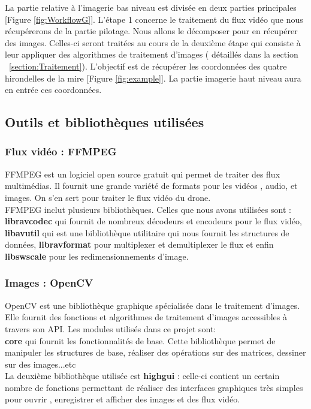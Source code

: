 \documentclass[12pt]{article}
\begin{document}
La partie relative à l'imagerie bas niveau est divisée en deux parties principales [Figure \ref{fig:WorkflowG}]. L'étape 1 concerne le traitement du flux vidéo que nous récupérerons de la partie pilotage. Nous allons le décomposer pour en récupérer des images. Celles-ci seront traitées au cours de la deuxième étape qui consiste à leur appliquer des algorithmes de traitement d'images ( détaillés dans la section ~\ref{section:Traitement}). L'objectif est de récupérer les coordonnées des quatre hirondelles de la mire [Figure \ref{fig:example}].
La partie imagerie haut niveau aura en entrée ces coordonnées.


\subsection{Outils et bibliothèques utilisées}
\subsubsection{Flux vidéo : FFMPEG}
FFMPEG \cite{FFMPEG} est un logiciel open source gratuit qui permet de traiter des flux multimédias. Il fournit une grande variété de formats pour les vidéos , audio, et images. On s'en sert pour traiter le flux vidéo du drone.\\ FFMPEG inclut plusieurs bibliothèques. Celles que nous avons utilisées sont : \textbf{libravcodec} qui fournit de nombreux décodeurs et encodeurs pour le flux vidéo, \textbf{libavutil} qui est une bibliothèque utilitaire qui nous fournit les structures de données, \textbf{libravformat} pour multiplexer et demultiplexer le flux et enfin \textbf{libswscale} pour les redimensionnements d'image.

\subsubsection{Images : OpenCV}
OpenCV \cite{OpenCV} est une bibliothèque graphique spécialisée dans le traitement d’images. Elle fournit des fonctions et algorithmes de traitement d'images accessibles à travers son API. Les modules utilisés dans ce projet sont:\\
\textbf{core} qui fournit les fonctionnalités de base. Cette bibliothèque permet de manipuler les structures de base, réaliser des opérations sur des matrices, dessiner sur des images...etc\\La deuxième bibliothèque utilisée est \textbf{highgui} : celle-ci contient un certain nombre de fonctions permettant de réaliser des interfaces graphiques très simples pour ouvrir , enregistrer et afficher des images et des flux vidéo.
\end{document}

